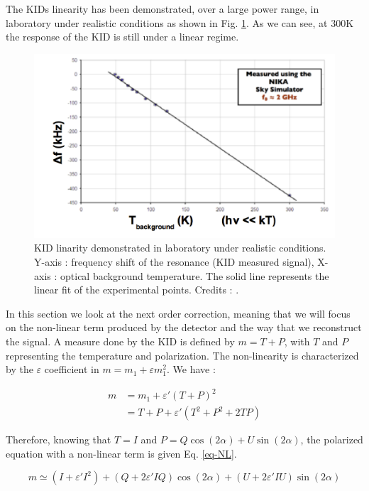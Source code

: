 The KIDs linearity has been demonstrated, over a large power range, in laboratory under realistic conditions as shown in Fig. \ref{KID-lin}. As we can see, at 300K the response of the KID is still under a linear regime.

\begin{figure}[h]
\center
	\includegraphics[scale=0.4]{Figures/KID-linearity-Monfardini2014.png}
	\caption{KID linarity demonstrated in laboratory under realistic conditions. Y-axis : frequency shift of the resonance (KID measured signal), X-axis : optical background temperature. The solid line represents the linear fit of the experimental points. Credits : \citet{2014JLTP..176..787M}.}
	\label{KID-lin}
\end{figure}

In this section we look at the next order correction, meaning that we will focus on the non-linear term produced by the detector and the way that we reconstruct the signal. A measure done by the KID is defined by $m = T + P$, with $T$ and $P$ representing the temperature and polarization. The non-linearity is characterized  by the $\varepsilon$ coefficient in $ m = m_{1} + \varepsilon m_{1}^{2}$. We have : 

\begin{equation}
\begin{split}
m & = m_{1} +\varepsilon' (T+P)^{2} \\
 & = T + P + \varepsilon'(T^{2} + P^{2} + 2TP) 
\end{split}
\end{equation}

Therefore, knowing that $T=I$ and $P = Q\cos(2\alpha) + U \sin(2\alpha)$, the polarized equation with a non-linear term is given Eq. \ref{eq-NL}.

\begin{equation}
m  \simeq (I + \varepsilon' I^{2}) + (Q + 2\varepsilon' IQ) \cos(2\alpha) + (U + 2 \varepsilon' IU) \sin(2\alpha)
\label{eq-NL}
\end{equation}

